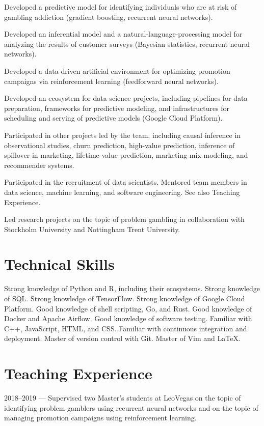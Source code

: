 \documentclass[journal]{IEEEtran}
\begin{document}
Developed a predictive model for identifying individuals who are at risk of
gambling addiction (gradient boosting, recurrent neural networks).

Developed an inferential model and a natural-language-processing model for
analyzing the results of customer surveys (Bayesian statistics, recurrent neural
networks).

Developed a data-driven artificial environment for optimizing promotion
campaigns via reinforcement learning (feedforward neural networks).

Developed an ecosystem for data-science projects, including pipelines for data
preparation, frameworks for predictive modeling, and infrastructures for
scheduling and serving of predictive models (Google Cloud Platform).

Participated in other projects led by the team, including causal inference in
observational studies, churn prediction, high-value prediction, inference of
spillover in marketing, lifetime-value prediction, marketing mix modeling, and
recommender systems.

Participated in the recruitment of data scientists. Mentored team members in
data science, machine learning, and software engineering. See also Teaching
Experience.

Led research projects on the topic of problem gambling in collaboration with
Stockholm University and Nottingham Trent University.

\section{Technical Skills}
Strong knowledge of Python and R, including their ecosystems. Strong knowledge
of SQL. Strong knowledge of TensorFlow. Strong knowledge of Google Cloud
Platform. Good knowledge of shell scripting, Go, and Rust. Good knowledge of
Docker and Apache Airflow. Good knowledge of software testing. Familiar with
C++, JavaScript, HTML, and CSS. Familiar with continuous integration and
deployment. Master of version control with Git. Master of Vim and LaTeX.

\section{Teaching Experience}
2018--2019 --- Supervised two Master's students at LeoVegas on the topic of
identifying problem gamblers using recurrent neural networks and on the topic
of managing promotion campaigns using reinforcement learning.
\end{document}
